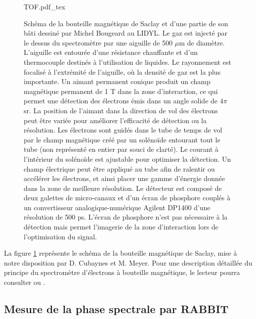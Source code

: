 \begin{figure}
\centering
\def\svgwidth{\columnwidth}
{TOF.pdf_tex}
\caption{Schéma de la bouteille magnétique de Saclay et d'une partie de son bâti dessiné par Michel Bougeard au LIDYL. Le gaz est injecté par le dessus du spectromètre par une aiguille de 500 $\mu$m de diamètre. L'aiguille est entourée d'une résistance chauffante et d'un thermocouple destinés à l'utilisation de liquides. Le rayonnement est focalisé à l'extrémité de l'aiguille, où la densité de gaz est la plus importante. Un aimant permanent conique produit un champ magnétique permanent de 1 T dans la zone d'interaction, ce qui permet une détection des électrons émis dans un angle solide de $4 \pi$ sr. La position de l'aimant dans la direction de vol des électrons peut être variée pour améliorer l'efficacité de détection ou la résolution. Les électrons sont guidés dans le tube de temps de vol par le champ magnétique créé par un solénoïde entourant tout le tube (non représenté en entier par souci de clarté). Le courant à l'intérieur du solénoïde est ajustable pour optimiser la détection. Un champ électrique peut être appliqué au tube afin de ralentir ou accélérer les électrons, et ainsi placer une gamme d'énergie donnée dans la zone de meilleure résolution. Le détecteur est composé de deux galettes de micro-canaux et d'un écran de phosphore couplés à un convertisseur analogique-numérique Agilent DP1400 d'une résolution de 500 ps. L'écran de phosphore n'est pas nécessaire à la détection mais permet l'imagerie de la zone d'interaction lors de l'optimisation du signal.}
\label{fig:TOF}
\end{figure}

La figure \ref{fig:TOF} représente le schéma de la bouteille magnétique de Saclay, mise à notre disposition par D. Cubaynes et M. Meyer. Pour une description détaillée du principe du spectromètre d'électrons à bouteille magnétique, le lecteur pourra consulter  ou .

\subsection{Mesure de la phase spectrale par RABBIT}

